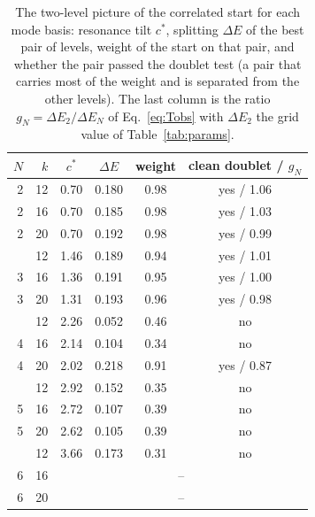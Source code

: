 \begin{table}[ht]
\centering
\small
\caption{The two-level picture of the correlated start for each mode basis: resonance tilt $c^*$, splitting $\Delta E$ of the best pair of levels, weight of the start on that pair, and whether the pair passed the doublet test (a pair that carries most of the weight and is separated from the other levels). The last column is the ratio $g_N=\Delta E_2/\Delta E_N$ of Eq.~\eqref{eq:Tobs} with $\Delta E_2$ the grid value of Table~\ref{tab:params}.}
\label{tab:doublet}
\begin{tabular}{rrcccc}
\toprule
$N$ & $k$ & $c^*$ & $\Delta E$ & weight & clean doublet / $g_N$ \\
\midrule
2 & 12 & 0.70 & 0.180 & 0.98 & yes / 1.06 \\
2 & 16 & 0.70 & 0.185 & 0.98 & yes / 1.03 \\
2 & 20 & 0.70 & 0.192 & 0.98 & yes / 0.99 \\
\addlinespace[2pt]
3 & 12 & 1.46 & 0.189 & 0.94 & yes / 1.01 \\
3 & 16 & 1.36 & 0.191 & 0.95 & yes / 1.00 \\
3 & 20 & 1.31 & 0.193 & 0.96 & yes / 0.98 \\
\addlinespace[2pt]
4 & 12 & 2.26 & 0.052 & 0.46 & no \\
4 & 16 & 2.14 & 0.104 & 0.34 & no \\
4 & 20 & 2.02 & 0.218 & 0.91 & yes / 0.87 \\
\addlinespace[2pt]
5 & 12 & 2.92 & 0.152 & 0.35 & no \\
5 & 16 & 2.72 & 0.107 & 0.39 & no \\
5 & 20 & 2.62 & 0.105 & 0.39 & no \\
\addlinespace[2pt]
6 & 12 & 3.66 & 0.173 & 0.31 & no \\
6 & 16 & \multicolumn{4}{c}{--} \\
6 & 20 & \multicolumn{4}{c}{--} \\
\bottomrule
\end{tabular}
\end{table}
